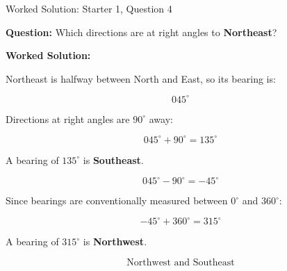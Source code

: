 \documentclass[aspectratio=169,11pt]{beamer}
\begin{document}
\begin{frame}{Worked Solution: Starter 1, Question 4}

\textbf{Question:} Which directions are at right angles to \textbf{Northeast}?

\textbf{Worked Solution:}

Northeast is halfway between North and East, so its bearing is:

\[
045^\circ
\]

Directions at right angles are \(90^\circ\) away:

\[
045^\circ + 90^\circ = 135^\circ
\]

A bearing of \(135^\circ\) is \textbf{Southeast}.

\[
045^\circ - 90^\circ = -45^\circ
\]

Since bearings are conventionally measured between \(0^\circ\) and \(360^\circ\):

\[
-45^\circ + 360^\circ = 315^\circ
\]

A bearing of \(315^\circ\) is \textbf{Northwest}.

\[
\boxed{\text{Northwest and Southeast}}
\]

\end{frame}
\end{document}
